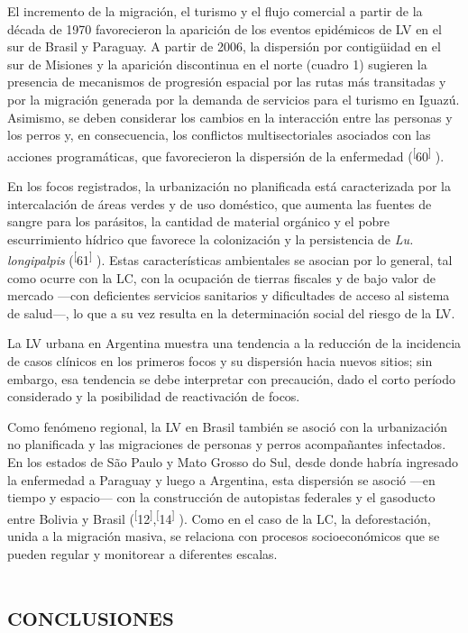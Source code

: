 \documentclass{article}
\begin{document}
El incremento de la migración, el turismo y el flujo comercial a partir de la
década de 1970 favorecieron la aparición de los eventos epidémicos de LV en el
sur de Brasil y Paraguay. A partir de 2006, la dispersión por contigüidad en el
sur de Misiones y la aparición discontinua en el norte (cuadro 1) sugieren la
presencia de mecanismos de progresión espacial por las rutas más transitadas y
por la migración generada por la demanda de servicios para el turismo en Iguazú.
Asimismo, se deben considerar los cambios en la interacción entre las personas y
los perros y, en consecuencia, los conflictos multisectoriales asociados con las
acciones programáticas, que favorecieron la dispersión de la enfermedad
(\textsuperscript{[}60\textsuperscript{]}
).

En los focos registrados, la urbanización no planificada está caracterizada por
la intercalación de áreas verdes y de uso doméstico, que aumenta las fuentes de
sangre para los parásitos, la cantidad de material orgánico y el pobre
escurrimiento hídrico que favorece la colonización y la persistencia de
\textit{Lu. longipalpis}
(\textsuperscript{[}61\textsuperscript{]}
). Estas características ambientales se asocian por lo general, tal como ocurre
con la LC, con la ocupación de tierras fiscales y de bajo valor de mercado —con
deficientes servicios sanitarios y dificultades de acceso al sistema de salud—,
lo que a su vez resulta en la determinación social del riesgo de la LV.

La LV urbana en Argentina muestra una tendencia a la reducción de la incidencia
de casos clínicos en los primeros focos y su dispersión hacia nuevos sitios; sin
embargo, esa tendencia se debe interpretar con precaución, dado el corto período
considerado y la posibilidad de reactivación de focos.

Como fenómeno regional, la LV en Brasil también se asoció con la urbanización no
planificada y las migraciones de personas y perros acompañantes infectados. En
los estados de São Paulo y Mato Grosso do Sul, desde donde habría ingresado la
enfermedad a Paraguay y luego a Argentina, esta dispersión se asoció —en tiempo
y espacio— con la construcción de autopistas federales y el gasoducto entre
Bolivia y Brasil (\textsuperscript{[}12\textsuperscript{]},\textsuperscript{[}14\textsuperscript{]}
). Como en el caso de la LC, la deforestación, unida a la migración masiva, se
relaciona con procesos socioeconómicos que se pueden regular y monitorear a
diferentes escalas.

\section{\textsc{conclusiones}}
\end{document}
